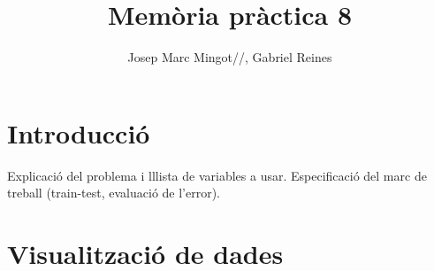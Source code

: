 \documentclass[a4paper,10pt]{article}
\title{Memòria pràctica 8}
\author{Josep Marc Mingot//, 
      Gabriel Reines}
\begin{document}



\maketitle

\begin{abstract}
\end{abstract}

\newpage
\tableofcontents

\newpage
\section{Introducció}

Explicació del problema i lllista de variables a usar.
Especificació del marc de treball (train-test, evaluació de l'error).


\section{Visualització de dades}
\end{document}
